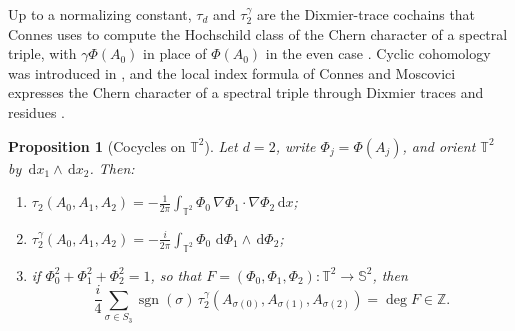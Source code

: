 \documentclass[11pt,a4paper,reqno]{amsart}
\newtheorem{proposition}[theorem]{Proposition}
\theoremstyle{definition}
\numberwithin{equation}{section}
\newcommand{\Z}{\mathbb{Z}}
\newcommand{\dif}{\,\mathrm{d}}
\begin{document}
Up to a normalizing constant, $\tau_d$ and $\tau_2^\gamma$ are the Dixmier-trace cochains that Connes uses to compute the Hochschild class of the Chern character of a spectral triple, with $\gamma\Phi(A_0)$ in place of $\Phi(A_0)$ in the even case \cite[Ch.~IV, Sect.~2, Thm.~8]{connes1994noncommutative}. Cyclic cohomology was introduced in \cite{connes1985noncommutative}, and the local index formula of Connes and Moscovici expresses the Chern character of a spectral triple through Dixmier traces and residues \cite{connes1995local}.

\begin{proposition}[Cocycles on $\mathbb{T}^2$]
\label{prop:cocycle}
Let $d = 2$, write $\Phi_j = \Phi(A_j)$, and orient $\mathbb{T}^2$ by $\dif x_1 \wedge \dif x_2$. Then:
\begin{enumerate}[label=(\alph*)]
    \item $\displaystyle \tau_2(A_0, A_1, A_2) = -\frac{1}{2\pi} \int_{\mathbb{T}^2} \Phi_0 \, \nabla\Phi_1 \cdot \nabla\Phi_2 \dif x$;
    \item $\displaystyle \tau_2^\gamma(A_0, A_1, A_2) = -\frac{i}{2\pi} \int_{\mathbb{T}^2} \Phi_0 \, \dif\Phi_1 \wedge \dif\Phi_2$;
    \item if $\Phi_0^2 + \Phi_1^2 + \Phi_2^2 = 1$, so that $F = (\Phi_0, \Phi_1, \Phi_2) \colon \mathbb{T}^2 \to \mathbb{S}^2$, then
    \begin{equation}
        \frac{i}{4} \sum_{\sigma \in S_3} \operatorname{sgn}(\sigma)\, \tau_2^\gamma(A_{\sigma(0)}, A_{\sigma(1)}, A_{\sigma(2)}) = \deg F \in \Z.
    \end{equation}
\end{enumerate}
\end{proposition}
\end{document}
